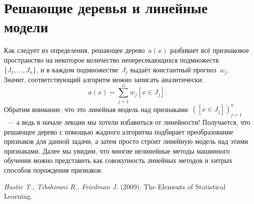 \documentclass[12pt,fleqn]{article}
\begin{document}
\section{Решающие деревья и линейные модели}
Как следует из определения, решающее дерево~$a(x)$ разбивает
всё признаковое пространство на некоторое количество непересекающихся подмножеств~$\{J_1, \dots, J_n\}$,
и в каждом подмножестве~$J_j$ выдаёт константный прогноз~$w_j$.
Значит, соответствующий алгоритм можно записать аналитически:
\[
    a(x)
    =
    \sum_{j = 1}^{n}
        w_j
        [x \in J_j].
\]
Обратим внимание, что это линейная модель над признаками~$([x \in J_j])_{j = 1}^{n}$~---
а ведь в начале лекции мы хотели избавиться от линейности!
Получается, что решающее дерево с помощью жадного алгоритма подбирает преобразование признаков
для данной задачи, а затем просто строит линейную модель над этими признаками.
Далее мы увидим, что многие нелинейные методы машинного обучения можно
представить как совокупность линейных методов и хитрых способов порождения признаков.

\begin{thebibliography}{1}
    \emph{Hastie T., Tibshirani R., Friedman J.} (2009).
    The Elements of Statistical Learning.
\end{thebibliography}
\end{document}
